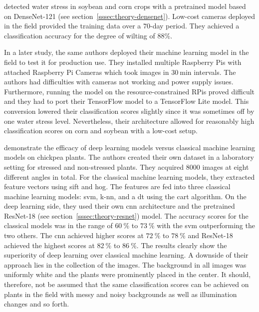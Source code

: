 \documentclass[draft,final]{vutinfth} %
\begin{document}
\textcite{ramos-giraldo2020} detected water stress in soybean and corn
crops with a pretrained model based on DenseNet-121 (see
section~\ref{sssec:theory-densenet}). Low-cost cameras deployed in the
field provided the training data over a $70$-day period. They achieved
a classification accuracy for the degree of wilting of 88\%.

In a later study, the same authors \cite{ramos-giraldo2020a} deployed
their machine learning model in the field to test it for production
use. They installed multiple Raspberry Pis with attached Raspberry Pi
Cameras which took images in $\qty{30}{\minute}$ intervals. The
authors had difficulties with cameras not working and power supply
issues. Furthermore, running the model on the resource-constrained
RPis proved difficult and they had to port their TensorFlow model to a
TensorFlow Lite model. This conversion lowered their classification
scores slightly since it was sometimes off by one water stress
level. Nevertheless, their architecture allowed for reasonably high
classification scores on corn and soybean with a low-cost setup.

\textcite{azimi2020} demonstrate the efficacy of deep learning models
versus classical machine learning models on chickpea plants. The
authors created their own dataset in a laboratory setting for stressed
and non-stressed plants. They acquired $8000$ images at eight
different angles in total. For the classical machine learning models,
they extracted feature vectors using \gls{sift} and \gls{hog}. The
features are fed into three classical machine learning models:
\gls{svm}, \gls{k-nn}, and a \gls{dt} using the \gls{cart}
algorithm. On the deep learning side, they used their own \gls{cnn}
architecture and the pretrained ResNet-18 (see
section~\ref{sssec:theory-resnet}) model. The accuracy scores for the
classical models was in the range of $\qty{60}{\percent}$ to
$\qty{73}{\percent}$ with the \gls{svm} outperforming the two
others. The \gls{cnn} achieved higher scores at $\qty{72}{\percent}$
to $\qty{78}{\percent}$ and ResNet-18 achieved the highest scores at
$\qty{82}{\percent}$ to $\qty{86}{\percent}$. The results clearly show
the superiority of deep learning over classical machine learning. A
downside of their approach lies in the collection of the images. The
background in all images was uniformly white and the plants were
prominently placed in the center. It should, therefore, not be assumed
that the same classification scores can be achieved on plants in the
field with messy and noisy backgrounds as well as illumination changes
and so forth.
\end{document}
